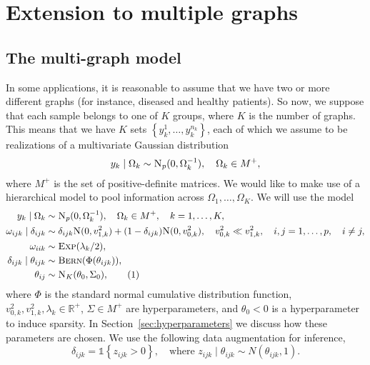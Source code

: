 \documentclass[a4paper, 11pt, oneside]{report}
\newcommand{\1}{\mathds{1}}
\newcommand{\inv}{^{-1}}
\newcommand{\Np}{\textsc{N}_p}
\newcommand{\Nor}{\textsc{N}}
\newcommand{\Bern}{\textsc{Bern}}
\newcommand{\Exp}{\textsc{Exp}}
\begin{document}
\chapter{Extension to multiple graphs}\label{chap:multigraph}
\section{The multi-graph model}
In some applications, it is reasonable to assume that we have two or more different graphs (for instance, diseased and healthy patients).
So now, we suppose that each sample belongs to one of $K$ groups, where $K$ is the number of graphs.
This means that we have $K$ sets $\left\{y_k^1, \dots, y_k^{n_k}\right\}$, each of which we assume to be realizations of a multivariate Gaussian distribution \[y_k \mid \Omega_k \sim \Np(0, \Omega_k\inv), \quad \Omega_k \in M^+,\] where $M^+$ is the set of positive-definite matrices.
We would like to make use of a hierarchical model to pool information across $\Omega_1,\dots,\Omega_K$.
We will use the model
\begin{align*}
	y_k \mid \Omega_k              & \sim \Np(0, \Omega_k^{-1}),\quad \Omega_k \in M^+, \quad k=1,\dots,K,                                                                               \\
	\omega_{ijk} \mid \delta_{ijk} & \sim \delta_{ijk} \Nor(0, v_{1,k}^2) + (1 - \delta_{ijk}) \Nor(0, v_{0,k}^2),  \quad v_{0,k}^2 \ll v_{1,k}^2, \quad i,j = 1,\dots,p,\quad i \neq j, \\
	\omega_{iik}                   & \sim \Exp(\lambda_k/2),                                                                                                                             \\
	\delta_{ijk} \mid \theta_{ijk} & \sim \Bern(\Phi(\theta_{ijk})),                                                                                                                     \\
	\theta_{ij}                    & \sim \textsc{N}_K(\theta_0, \Sigma_0),\stepcounter{equation}\tag{\theequation}\label{eq:mg-model}
\end{align*}
where $\Phi$ is the standard normal cumulative distribution function, $v_{0,k}^2,
	v_{1,k}^2, \lambda_k \in \mathbb{R}^+$, $\Sigma \in M^+$ are hyperparameters, and $\theta_0 < 0$ is a hyperparameter to induce sparsity.
In Section~\ref{sec:hyperparameters} we discuss how these parameters are chosen.
We use the following data augmentation for inference,
\[\delta_{ijk} = \1\left\{z_{ijk} > 0\right\}, \quad \text{where } z_{ijk} \mid \theta_{ijk} \sim N\left(\theta_{ijk}, 1\right).\]
\end{document}
